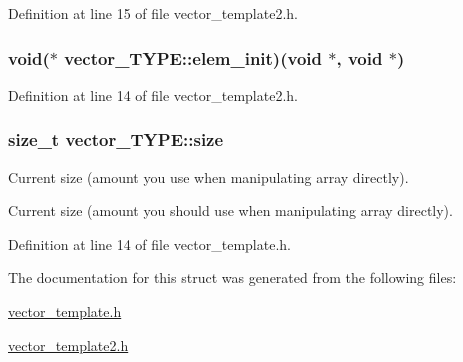 Definition at line 15 of file vector\-\_\-template2.\-h.

\hypertarget{structvector___t_y_p_e_acc422333d8ea0e69a98f9016019a7b09}{
\subsubsection[{elem\-\_\-init}]{\setlength{\rightskip}{0pt plus 5cm}void($\ast$ vector\-\_\-\-T\-Y\-P\-E\-::elem\-\_\-init)(void $\ast$, void $\ast$)}}\label{structvector___t_y_p_e_acc422333d8ea0e69a98f9016019a7b09}


Definition at line 14 of file vector\-\_\-template2.\-h.

\hypertarget{structvector___t_y_p_e_a5c187692d3e0d1659d7024a751ec4b4d}{
\subsubsection[{size}]{\setlength{\rightskip}{0pt plus 5cm}size\-\_\-t vector\-\_\-\-T\-Y\-P\-E\-::size}}\label{structvector___t_y_p_e_a5c187692d3e0d1659d7024a751ec4b4d}


Current size (amount you use when manipulating array directly). 

Current size (amount you should use when manipulating array directly).

Definition at line 14 of file vector\-\_\-template.\-h.



The documentation for this struct was generated from the following files\-:\begin{DoxyCompactItemize}
\item 
\hyperlink{vector__template_8h}{vector\-\_\-template.\-h}\item 
\hyperlink{vector__template2_8h}{vector\-\_\-template2.\-h}\end{DoxyCompactItemize}
